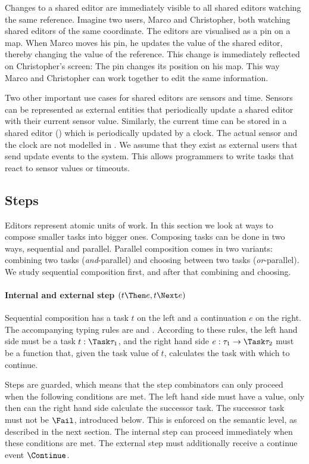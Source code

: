 Changes to a shared editor are immediately visible to all shared editors watching the same reference.
Imagine two users, Marco and Christopher, both watching shared editors of the same coordinate.
The editors are visualised as a pin on a map.
When Marco moves his pin, he updates the value of the shared editor, thereby changing the value of the reference.
This change is immediately reflected on Christopher's screen: The pin changes its position on his map.
This way Marco and Christopher can work together to edit the same information.

\label{sub:time}
Two other important use cases for shared editors are sensors and time.
Sensors can be represented as external entities that periodically update a shared editor with their current sensor value.
Similarly, the current time can be stored in a shared editor () which is periodically updated by a clock.
The actual sensor and the clock are not modelled in \TOPHAT.
We assume that they exist as external users that send update events to the system.
This allows programmers to write tasks that react to sensor values or timeouts.


\subsection{Steps}

Editors represent atomic units of work.
In this section we look at ways to compose smaller tasks into bigger ones.
Composing tasks can be done in two ways, sequential and parallel.
Parallel composition comes in two variants: combining two tasks (\emph{and}-parallel) and choosing between two tasks (\emph{or}-parallel).
We study sequential composition first, and after that combining and choosing.


\paragraph{Internal and external step $(t \Then e, t \Next e)$}
\label{sub:steps}

Sequential composition has a task $t$ on the left and a continuation $e$ on the right.
The accompanying typing rules are  and .
According to these rules, the left hand side must be a task $t : \Task \tau_1$, and the right hand side $e : \tau_1 \to \Task \tau_2$ must be a function that, given the task value of $t$, calculates the task with which to continue.

Steps are guarded, which means that the step combinators can only proceed when the following conditions are met.
The left hand side must have a value, only then can the right hand side calculate the successor task.
The successor task must not be $\Fail$, introduced below.
This is enforced on the semantic level, as described in the next section.
The internal step can proceed immediately when these conditions are met.
The external step must additionally receive a continue event $\Continue$.


